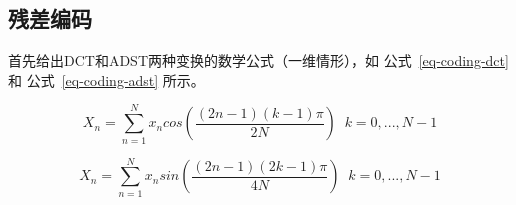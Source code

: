 






\subsection{残差编码}

首先给出DCT和ADST两种变换的数学公式（一维情形），如 公式~\ref{eq-coding-dct} 和 公式~\ref{eq-coding-adst} 所示。

\begin{equation}
\label{eq-coding-dct}
X_n = \sum_{n=1}^N x_ncos(\frac{(2n-1)(k-1) \pi}{2N}) \;\; k=0,...,N-1
\end{equation}

\begin{equation}
\label{eq-coding-adst}
X_n = \sum_{n=1}^N x_nsin(\frac{(2n-1)(2k-1) \pi}{4N}) \;\; k=0,...,N-1
\end{equation}

